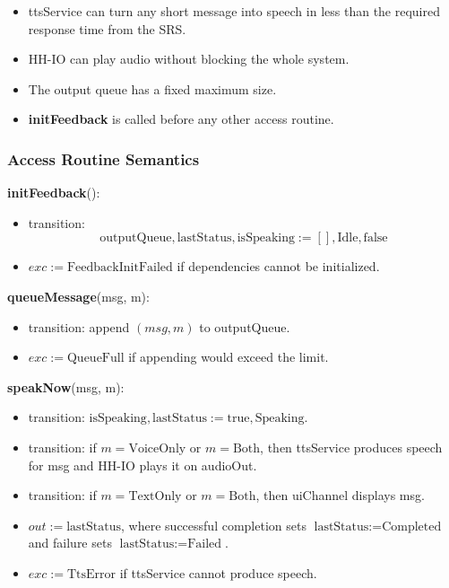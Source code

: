 \documentclass[12pt, titlepage]{article}
\begin{document}
\begin{itemize}
  \item ttsService can turn any short message into speech in less than the
  required response time from the SRS.
  \item HH-IO can play audio without blocking the whole system.
  \item The output queue has a fixed maximum size.
  \item \textbf{initFeedback} is called before any other access routine.
\end{itemize}

\subsubsection{Access Routine Semantics}

\noindent
\textbf{initFeedback}():
\begin{itemize}
  \item transition:
  \[
    \text{outputQueue}, \text{lastStatus}, \text{isSpeaking}
    := [], \text{Idle}, \text{false}
  \]
  \item $exc := \text{FeedbackInitFailed}$ if dependencies cannot be initialized.
\end{itemize}

\noindent
\textbf{queueMessage}(msg, m):
\begin{itemize}
  \item transition: append $(msg, m)$ to outputQueue.
  \item $exc := \text{QueueFull}$ if appending would exceed the limit.
\end{itemize}

\noindent
\textbf{speakNow}(msg, m):
\begin{itemize}
  \item transition: $\text{isSpeaking}, \text{lastStatus} := \text{true},
  \text{Speaking}$.
  \item transition: if $m = \text{VoiceOnly}$ or $m = \text{Both}$, then
  ttsService produces speech for msg and HH-IO plays it on audioOut.
  \item transition: if $m = \text{TextOnly}$ or $m = \text{Both}$, then
  uiChannel displays msg.
  \item $out := \text{lastStatus}$, where successful completion sets
  $\text{lastStatus} := \text{Completed}$ and failure sets
  $\text{lastStatus} := \text{Failed}$.
  \item $exc := \text{TtsError}$ if ttsService cannot produce speech.
\end{itemize}
\end{document}
